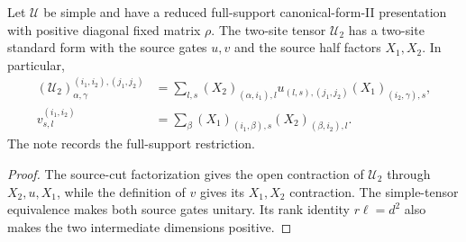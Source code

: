 \begin{definition}
    \label{def:mpu_source_open_two_site_standard_form}
    \leanok
    Let $\mathcal U$ be simple and have a reduced full-support
    canonical-form-II presentation with positive diagonal fixed matrix $\rho$.
    The two-site tensor $\mathcal U_2$ has a two-site standard form with
    the source gates $u,v$ and the source half factors $X_1,X_2$. In
    particular,
    \begin{align}
        (\mathcal U_2)^{(i_1,i_2),(j_1,j_2)}_{\alpha,\gamma}
         & =\sum_{l,s}(X_2)_{(\alpha,i_1),l}
        u_{(l,s),(j_1,j_2)}(X_1)_{(i_2,\gamma),s},                  \\
        v^{(i_1,i_2)}_{s,l}
         & =\sum_{\beta}(X_1)_{(i_1,\beta),s}(X_2)_{(\beta,i_2),l}.
    \end{align}
    The note \cite{gap:mpu_canonical_form_full_support} records the full-support
    restriction.
\end{definition}

\begin{proof}\leanok
    The source-cut factorization gives the open contraction of
    $\mathcal U_2$ through $X_2,u,X_1$, while the definition of $v$ gives
    its $X_1,X_2$ contraction. The simple-tensor equivalence makes both
    source gates unitary. Its rank identity $r\ell=d^2$ also makes the two
    intermediate dimensions positive.
\end{proof}

